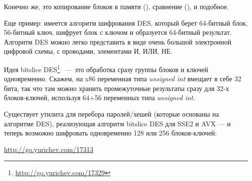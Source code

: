 Конечно же, это копирование блоков в памяти (), сравнение (), и подобное.

Еще пример: имеется алгоритм шифрования DES, который берет 64-битный блок, 56-битный ключ, 
шифрует блок с ключом и образуется 64-битный результат.
Алгоритм DES можно легко представить в виде очень большой электронной цифровой схемы, 
с проводами, элементами И, ИЛИ, НЕ.

\label{bitslicedes}
\newcommand{\URLBS}{\url{http://go.yurichev.com/17329}}

Идея bitslice DES\footnote{\URLBS} ~--- это обработка сразу группы блоков и ключей одновременно. 
Скажем, на x86 переменная типа \emph{unsigned int} вмещает в себе 32 бита, так что там можно хранить 
промежуточные результаты сразу для 32-х блоков-ключей, используя 64+56 переменных типа \emph{unsigned int}.

\myindex{\oracle}
Существует утилита для перебора паролей/хешей \oracle (которые основаны на алгоритме DES), 
реализующая алгоритм bitslice DES для SSE2 и AVX --- и теперь возможно шифровать одновременно 
128 или 256 блоков-ключей:

\url{http://go.yurichev.com/17313}




